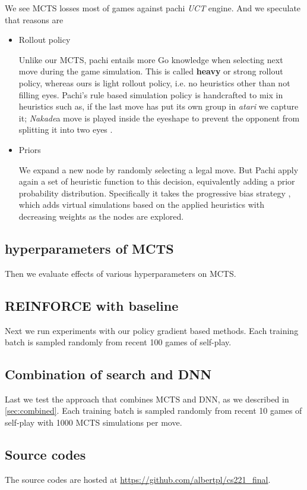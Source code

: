 \documentclass{article}
\begin{document}
We see MCTS losses most of games against pachi \textit{UCT} engine. And we speculate that reasons are
\begin{itemize}
  \item
    Rollout policy 

    Unlike our MCTS, pachi entails more Go knowledge when selecting next move during the game simulation. This is called \textbf{heavy} or strong rollout policy, whereas ours is light rollout policy, i.e. no heuristics other than not filling eyes. Pachi's rule based simulation policy is handcrafted to mix in heuristics such as,  if the last move has put its own group in \textit{atari} we capture it; \textit{Nakade}a move is played inside the eyeshape to prevent the opponent from splitting it into two eyes \cite{baudivs2011pachi}.

  \item
    Priors
  
    We expand a new node by randomly selecting a legal move. But Pachi apply again a set of heuristic function to this decision, equivalently adding a prior probability distribution.  Specifically it takes the progressive bias strategy \cite{gelly2007combining}, which adds virtual simulations based on the applied heuristics with decreasing weights as the nodes are explored.

\end{itemize}

\subsection{hyperparameters of MCTS}
Then we evaluate effects of various hyperparameters on MCTS.

\subsection{REINFORCE with baseline}
Next we run experiments with our policy gradient based methods. Each training batch is sampled randomly from recent 100 games of self-play.


\subsection{Combination of search and DNN}
Last we test the approach that combines MCTS and DNN, as we described in \ref{sec:combined}. Each training batch is sampled randomly from recent 10 games of self-play with 1000 MCTS simulations per move.

\subsection*{Source codes}
    The source codes are hosted at \url{https://github.com/albertpl/cs221_final}.
\end{document}
